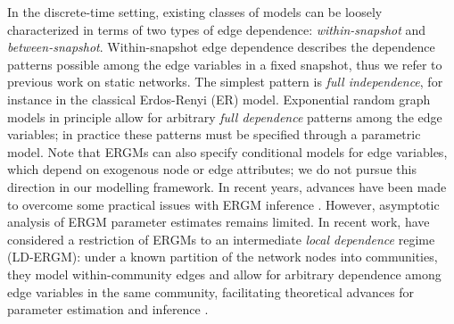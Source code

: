 \documentclass[12pt]{article}
\newcommand{\0}{{\bf 0}}
\begin{document}
In the discrete-time setting, existing classes of models can be loosely characterized in terms of two types of edge dependence: {\em within-snapshot} and {\em between-snapshot}.
Within-snapshot edge dependence describes the dependence patterns possible among the edge variables in a fixed snapshot, thus we refer to previous work on static networks.
The simplest pattern is {\em full independence}, for instance in the classical Erdos-Renyi (ER) model.
Exponential random graph models \citep[ERGM,][]{robins2007_supp} in principle allow for arbitrary {\em full dependence} patterns among the edge variables; in practice these patterns must be specified through a parametric model.
Note that ERGMs can also specify conditional models for edge variables, which depend on exogenous node or edge attributes; we do not pursue this direction in our modelling framework.
In recent years, advances have been made to overcome some practical issues with ERGM inference \citep{blackburn2023practical_supp}. 
However, asymptotic analysis of ERGM parameter estimates remains limited. %
In recent work, \citet{schweinberger2020_supp} have considered a restriction of ERGMs to an intermediate {\em local dependence} regime (LD-ERGM): under a known partition of the network nodes into communities, they model within-community edges and allow for arbitrary dependence among edge variables in the same community, facilitating theoretical advances for parameter estimation and inference \citep{stewart2024rates_supp}. %
\end{document}
